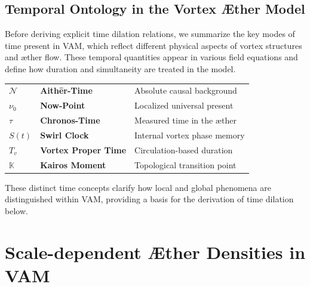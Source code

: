 \subsection*{Temporal Ontology in the Vortex Æther Model}

Before deriving explicit time dilation relations, we summarize the key modes of time present in VAM, which reflect different physical aspects of vortex structures and æther flow. These temporal quantities appear in various field equations and define how duration and simultaneity are treated in the model.

\begin{center}
\begin{tcolorbox}[
  colback=gray!10,
  colframe=black,
  width=0.9\textwidth,
  sharp corners=southwest,
  boxrule=0.5pt,
  before skip=10pt,
  after skip=10pt,
  title=\textbf{Table: Ætheric Time Modes in the Vortex Æther Model},
  fonttitle=\bfseries,
]
\renewcommand{\arraystretch}{1.25}
\begin{tabular}{@{}lll@{}}
  \(\mathcal{N}\)     & \textbf{Aithēr-Time}         & Absolute causal background \\
  \(\nu_0\)           & \textbf{Now-Point}           & Localized universal present \\
  \(\tau\)            & \textbf{Chronos-Time}        & Measured time in the æther \\
  \(S(t)\)            & \textbf{Swirl Clock}         & Internal vortex phase memory \\
  \(T_v\)             & \textbf{Vortex Proper Time}  & Circulation-based duration \\
  \(\mathbb{K}\)      & \textbf{Kairos Moment}       & Topological transition point \\
\end{tabular}
\end{tcolorbox}
\end{center}

\label{tab:ÆtherTimeModes}



These distinct time concepts clarify how local and global phenomena are distinguished within VAM, providing a basis for the derivation of time dilation below.



\section*{Scale-dependent Æther Densities in VAM}


